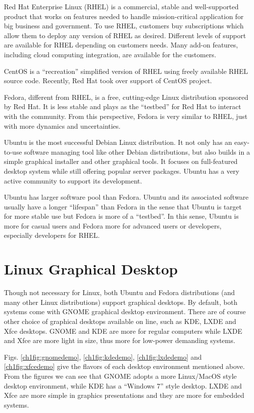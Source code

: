 Red Hat Enterprise Linux (RHEL) is a commercial, stable and well-supported product that works on features needed to handle mission-critical application for big business and government. To use RHEL, customers buy subscriptions which allow them to deploy any version of RHEL as desired. Different levels of support are available for RHEL depending on customers needs. Many add-on features, including cloud computing integration, are available for the customers.

CentOS is a ``recreation'' simplified version of RHEL using freely available RHEL source code. Recently, Red Hat took over support of CentOS project.

Fedora, different from RHEL, is a free, cutting-edge Linux distribution sponsored by Red Hat. It is less stable and plays as the ``testbed'' for Red Hat to interact with the community. From this perspective, Fedora is very similar to RHEL, just with more dynamics and uncertainties.

Ubuntu is the most successful Debian Linux distribution. It not only has an easy-to-use software managing tool like other Debian distributions, but also builds in a simple graphical installer and other graphical tools. It focuses on full-featured desktop system while still offering popular server packages. Ubuntu has a very active community to support its development.

Ubuntu has larger software pool than Fedora. Ubuntu and its associated software usually have a longer ``lifespan'' than Fedora in the sense that Ubuntu is target for more stable use but Fedora is more of a ``testbed''. In this sense, Ubuntu is more for casual users and Fedora more for advanced users or developers, especially developers for RHEL.

\section{Linux Graphical Desktop}

Though not necessary for Linux, both Ubuntu and Fedora distributions (and many other Linux distributions) support graphical desktops. By default, both systems come with GNOME graphical desktop environment. There are of course other choice of graphical desktops available on line, such as KDE, LXDE and Xfce desktops. GNOME and KDE are more for regular computers while LXDE and Xfce are more light in size, thus more for low-power demanding systems.

Figs. \ref{ch1fig:gnomedemo}, \ref{ch1fig:kdedemo}, \ref{ch1fig:lxdedemo} and \ref{ch1fig:xfcedemo} give the flavors of each desktop environment mentioned above. From the figures we can see that GNOME adopts a more Linux/MacOS style desktop environment, while KDE has a ``Windows 7'' style desktop. LXDE and Xfce are more simple in graphics presentations and they are more for embedded systems.

